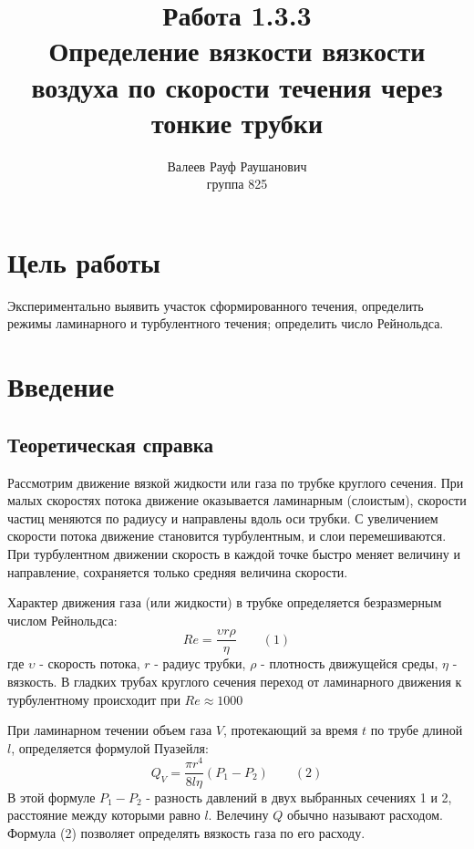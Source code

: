 \documentclass[a4paper, 12pt]{article}%
\author{Валеев Рауф Раушанович \\
группа 825}
\title{\textbf{Работа 1.3.3 \\ Определение вязкости вязкости воздуха по скорости течения через тонкие трубки}}
\begin{document}
\maketitle
\section*{Цель работы} Экспериментально выявить участок сформированного течения, определить режимы ламинарного и турбулентного течения; определить число Рейнольдса.
\section*{Введение}
\subsection*{Теоретическая справка}
Рассмотрим движение вязкой жидкости или газа по трубке круглого сечения. При малых скоростях потока движение оказывается ламинарным (слоистым), скорости частиц меняются по радиусу и направлены вдоль оси трубки. С увеличением скорости потока движение становится турбулентным, и слои перемешиваются. При турбулентном движении скорость в каждой точке быстро меняет величину и направление, сохраняется только средняя величина скорости.

Характер движения газа (или жидкости) в трубке определяется безразмерным числом Рейнольдса:
\[Re = \dfrac{\upsilon r \rho}{\eta} \text{  } \text{  } \text{  }(1)\]
где $\upsilon$ - скорость потока, $r$ - радиус трубки, $\rho$ - плотность движущейся среды, $\eta$ - вязкость. В гладких трубах круглого сечения переход от ламинарного движения к турбулентному происходит при $Re \approx 1000$

При ламинарном течении объем газа $V$, протекающий за время $t$ по трубе длиной $l$, определяется формулой Пуазейля:
\[Q_V = \dfrac{\pi r^4}{8 l \eta}(P_1 - P_2) \text{  } \text{  } \text{  }(2)\]
В этой формуле $P_1 - P_2$ - разность давлений в двух выбранных сечениях 1 и 2, расстояние между которыми равно $l$. Велечину $Q$ обычно называют расходом. Формула (2) позволяет определять вязкость газа по его расходу.
\end{document}
